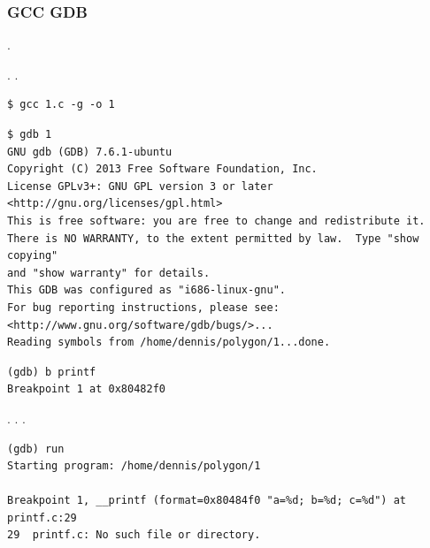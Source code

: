 \ifdefined\IncludeGDB
\subsubsection{GCC \AndENRU GDB}

.

 .
.

\begin{lstlisting}
$ gcc 1.c -g -o 1
\end{lstlisting}

\begin{lstlisting}
$ gdb 1
GNU gdb (GDB) 7.6.1-ubuntu
Copyright (C) 2013 Free Software Foundation, Inc.
License GPLv3+: GNU GPL version 3 or later <http://gnu.org/licenses/gpl.html>
This is free software: you are free to change and redistribute it.
There is NO WARRANTY, to the extent permitted by law.  Type "show copying"
and "show warranty" for details.
This GDB was configured as "i686-linux-gnu".
For bug reporting instructions, please see:
<http://www.gnu.org/software/gdb/bugs/>...
Reading symbols from /home/dennis/polygon/1...done.
\end{lstlisting}

\begin{lstlisting}[caption=\RU{установим точку останова на}\EN{let's set breakpoint on}\ES{establezcamos un punto de interrupción en} \printf]
(gdb) b printf
Breakpoint 1 at 0x80482f0
\end{lstlisting}

.
 \printf%
.
.

\begin{lstlisting}
(gdb) run
Starting program: /home/dennis/polygon/1 

Breakpoint 1, __printf (format=0x80484f0 "a=%d; b=%d; c=%d") at printf.c:29
29	printf.c: No such file or directory.
\end{lstlisting}

